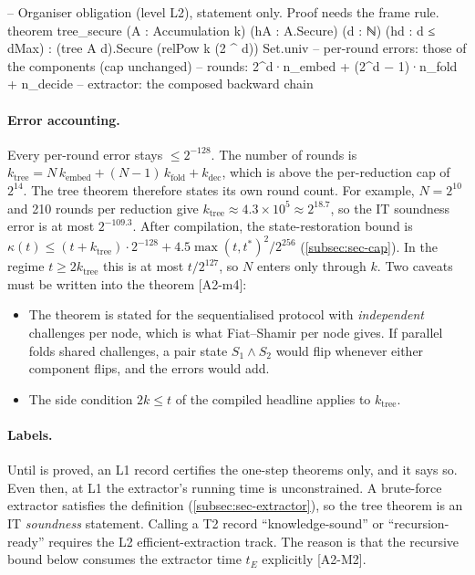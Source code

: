 \begin{leancode}
-- Organiser obligation (level L2), statement only. Proof needs the frame rule.
theorem tree_secure (A : Accumulation k) (hA : A.Secure) (d : ℕ) (hd : d ≤ dMax) :
    (tree A d).Secure (relPow k (2 ^ d)) Set.univ
-- per-round errors: those of the components (cap unchanged)
-- rounds: 2^d·n_embed + (2^d − 1)·n_fold + n_decide
-- extractor: the composed backward chain
\end{leancode}

\paragraph{Error accounting.} Every per-round error stays $\le2^{-128}$. The number of rounds is
$k_{\mathrm{tree}}=N\,k_{\mathrm{embed}}+(N-1)\,k_{\mathrm{fold}}+k_{\mathrm{dec}}$, which is above
the per-reduction cap of $2^{14}$. The tree theorem therefore states its own round count. For example,
$N=2^{10}$ and 210 rounds per reduction give $k_{\mathrm{tree}}\approx4.3\times10^5\approx2^{18.7}$,
so the IT soundness error is at most $2^{-109.3}$. After compilation, the state-restoration bound is
$\kappa(t)\le(t+k_{\mathrm{tree}})\cdot2^{-128}+4.5\max(t,t^*)^2/2^{256}$
(\cref{subsec:sec-cap}). In the regime $t\ge2k_{\mathrm{tree}}$ this is at most $t/2^{127}$, so $N$
enters only through $k$. Two caveats must be written into the theorem [A2-m4]:
\begin{itemize}[nosep]
\item The theorem is stated for the sequentialised protocol with \emph{independent} challenges per
  node, which is what Fiat--Shamir per node gives. If parallel folds shared challenges, a pair state
  $S_1\wedge S_2$ would flip whenever either component flips, and the errors would add.
\item The side condition $2k\le t$ of the compiled headline applies to $k_{\mathrm{tree}}$.
\end{itemize}

\paragraph{Labels.} Until  is proved, an L1 record certifies the one-step
theorems only, and it says so. Even then, at L1 the extractor's running time is unconstrained. A
brute-force extractor satisfies the definition (\cref{subsec:sec-extractor}), so the tree theorem is
an IT \emph{soundness} statement. Calling a T2 record \enquote{knowledge-sound} or
\enquote{recursion-ready} requires the L2 efficient-extraction track. The reason is that the
recursive bound below consumes the extractor time $t_E$ explicitly [A2-M2].

